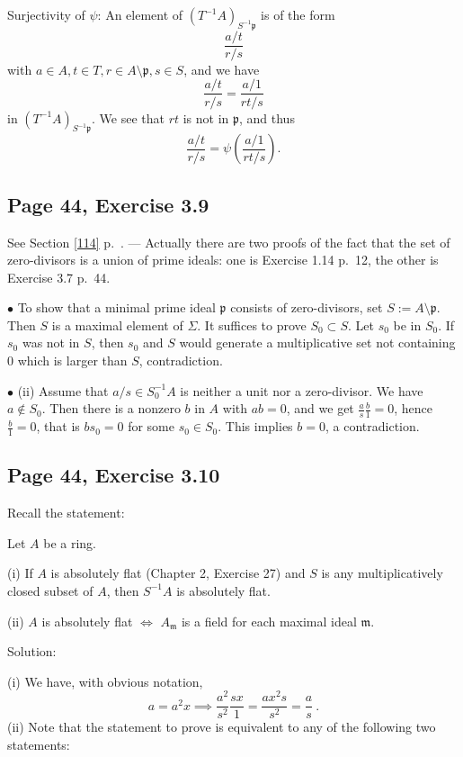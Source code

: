 \documentclass[parskip=half,fontsize=12pt]{scrartcl}%
\newcommand{\mf}{\mathfrak}
\newcommand{\mmm}{\mf m}
\newcommand{\ppp}{\mf p}
\newcommand{\bu}{\bullet}
\begin{document}
Surjectivity of $\psi$: An element of $(T^{-1}A)_{S^{-1}\ppp}$ is of the form 
$$
\frac{a/t}{r/s}
$$ 
with $a\in A,t\in T,r\in A\setminus\ppp, s\in S$, and we have 
$$
\frac{a/t}{r/s}=\frac{a/1}{rt/s}
$$ 
in $(T^{-1}A)_{S^{-1}\ppp}$. We see that $rt$ is not in $\ppp$, and thus 
$$
\frac{a/t}{r/s}=\psi\left(\frac{a/1}{rt/s}\right).
$$

\subsection{Page 44, Exercise 3.9}%

See Section \ref{114} p.~\pageref{114}. --- Actually there are two proofs of the fact that the set of zero-divisors  is a union of prime ideals: one is Exercise 1.14 p.~12, the other is Exercise 3.7 p.~44.

$\bu$ To show that a minimal prime ideal $\ppp$ consists of zero-divisors, set $S:=A\setminus\ppp$. Then $S$ is a maximal element of $\Sigma$. It suffices to prove $S_0\subset S$. Let $s_0$ be in $S_0$. If $s_0$ was not in $S$, then $s_0$ and $S$ would generate a multiplicative set not containing $0$ which is larger than $S$, contradiction. %

$\bu$ (ii) Assume that $a/s\in S_0^{-1}A$ is neither a unit nor a zero-divisor. We have $a\notin S_0$. Then there is a nonzero $b$ in $A$ with $ab=0$, and we get $\frac as\frac b1=0$, hence $\frac b1=0$, that is $bs_0=0$ for some $s_0\in S_0$. This implies $b=0$, a contradiction.

\subsection{Page 44, Exercise 3.10}\label{310}%

Recall the statement:

Let $A$ be a ring.

(i) If $A$ is absolutely flat (Chapter 2, Exercise 27) and $S$ is any multiplicatively 
closed subset of $A$, then $S^{-1}A$ is absolutely flat.

(ii) $A$ is absolutely flat $\iff$ $A_\mmm$ is a field for each maximal ideal $\mmm$.

Solution:

(i) We have, with obvious notation, 
$$
a=a^2x\implies\frac{a^2}{s^2}\frac{sx}1=\frac{ax^2s}{s^2}=\frac as\ .
$$ 
(ii) Note that the statement to prove is equivalent to any of the following two statements:
\end{document}
